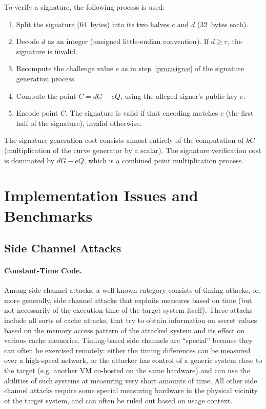 \documentclass{llncs}
\begin{document}
To verify a signature, the following process is used:
\begin{enumerate}

    \item Split the signature (64~bytes) into its two halves $c$ and $d$
    (32~bytes each).

    \item Decode $d$ as an integer (unsigned little-endian convention).
    If $d \geq r$, the signature is invalid.

    \item Recompute the challenge value $e$ as in step~\ref{proc:sign:e}
    of the signature generation process.

    \item Compute the point $C = dG - eQ$, using the alleged signer's
    public key $e$.

    \item Encode point $C$. The signature is valid if that encoding
    matches $c$ (the first half of the signature), invalid otherwise.

\end{enumerate}

The signature generation cost consists almost entirely of the computation
of $kG$ (multiplication of the curve generator by a scalar). The signature
verification cost is dominated by $dG - eQ$, which is a combined point
multiplication process.

\section{Implementation Issues and Benchmarks}\label{sec:impl}

\subsection{Side Channel Attacks}\label{sec:impl:sidechannels}

\paragraph{Constant-Time Code.}

Among side channel attacks, a well-known category consists of timing
attacks, or, more generally, side channel attacks that exploits measures
based on time (but not necessarily of the execution time of the target
system itself). These attacks include all sorts of cache attacks, that
try to obtain information on secret values based on the memory access
pattern of the attacked system and its effect on various cache
memories. Timing-based side channels are ``special'' because they can
often be exercised remotely: either the timing differences can be
measured over a high-speed network, or the attacker has control of a
generic system close to the target (e.g. another VM co-hosted on the
same hardware) and can use the abilities of such systems at measuring
very short amounts of time. All other side channel attacks require some
special measuring hardware in the physical vicinity of the target
system, and can often be ruled out based on usage context.
\end{document}
